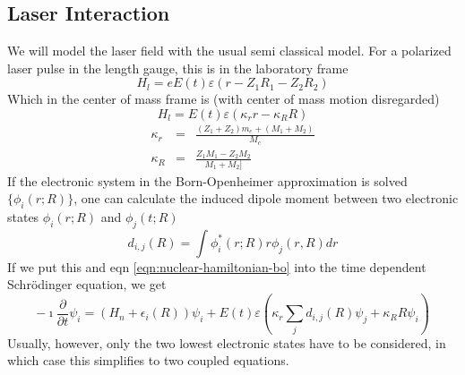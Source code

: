 \documentclass[a4paper]{article}
\begin{document}
\subsection{Laser Interaction}
We will model the laser field with the usual semi classical model. For a polarized laser pulse in 
the length gauge, this is in the laboratory frame
\begin{equation}
 H_l = e E(t) \varepsilon ( r - Z_1 R_1 - Z_2 R_2)
\end{equation}
Which in the center of mass frame is (with center of mass motion disregarded)
\begin{equation}
 H_l = E(t) \varepsilon ( \kappa_r r - \kappa_R R )
\end{equation}
\begin{eqnarray}
	\kappa_r &=& \frac{(Z_1 + Z_2) m_e + (M_1 + M_2)}{M_c} \\
	\kappa_R &=& \frac{Z_1 M_1 - Z_2 M_2}{M_1 + M_2]}
\end{eqnarray}
If the electronic system in the Born-Openheimer approximation is solved $\{ \phi_i(r; R) \}$, one can calculate the induced dipole moment 
between two electronic states $\phi_i(r; R)$ and $\phi_j(t; R)$
\begin{equation}
	d_{i,j}(R) = \int \phi_i^*(r; R) r \phi_j(r, R) dr
\end{equation}
If we put this and eqn \ref{eqn:nuclear-hamiltonian-bo} into the time dependent Schrödinger equation, we get
\begin{equation}
 - \imath \frac{\partial}{\partial t} \psi_i = \left( H_n + \epsilon_i(R) \right) \psi_i + E(t) \varepsilon \left( \kappa_r \sum_j d_{i, j}(R) \psi_j + \kappa_R R \psi_i\right)
\end{equation}
Usually, however, only the two lowest electronic states have to be considered, in which case this simplifies to two coupled equations.
\end{document}
